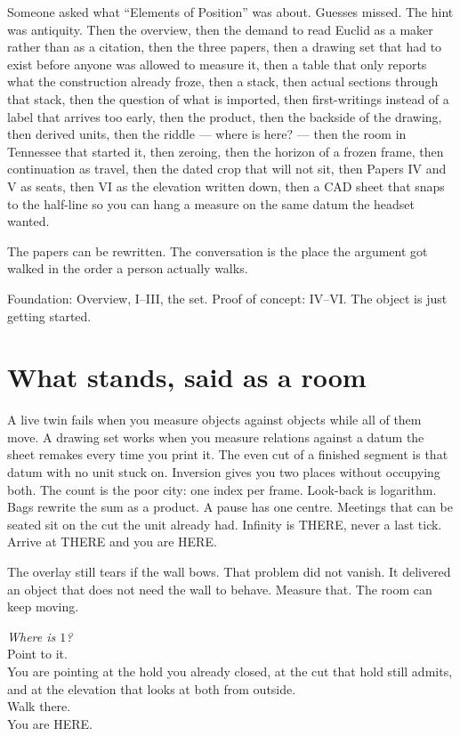 \documentclass[11pt,a4paper]{article}
\begin{document}
Someone asked what ``Elements of Position'' was about.
Guesses missed.
The hint was antiquity.
Then the overview, then the demand to read Euclid as a maker rather than as a citation, then the three papers, then a drawing set that had to exist before anyone was allowed to measure it, then a table that only reports what the construction already froze, then a stack, then actual sections through that stack, then the question of what is imported, then first-writings instead of a label that arrives too early, then the product, then the backside of the drawing, then derived units, then the riddle --- where is here? --- then the room in Tennessee that started it, then zeroing, then the horizon of a frozen frame, then continuation as travel, then the dated crop that will not sit, then Papers IV and V as seats, then VI as the elevation written down, then a CAD sheet that snaps to the half-line so you can hang a measure on the same datum the headset wanted.

The papers can be rewritten.
The conversation is the place the argument got walked in the order a person actually walks.

Foundation: Overview, I--III, the set.
Proof of concept: IV--VI.
The object is just getting started.

\section{What stands, said as a room}

A live twin fails when you measure objects against objects while all of them move.
A drawing set works when you measure relations against a datum the sheet remakes every time you print it.
The even cut of a finished segment is that datum with no unit stuck on.
Inversion gives you two places without occupying both.
The count is the poor city: one index per frame.
Look-back is logarithm.
Bags rewrite the sum as a product.
A pause has one centre.
Meetings that can be seated sit on the cut the unit already had.
Infinity is THERE, never a last tick.
Arrive at THERE and you are HERE.

The overlay still tears if the wall bows.
That problem did not vanish.
It delivered an object that does not need the wall to behave.
Measure that.
The room can keep moving.

\vspace{1.8em}
\noindent
\textit{Where is \(1\)?}\\
Point to it.\\
You are pointing at the hold you already closed, at the cut that hold still admits, and at the elevation that looks at both from outside.\\
Walk there.\\
You are HERE.
\end{document}

